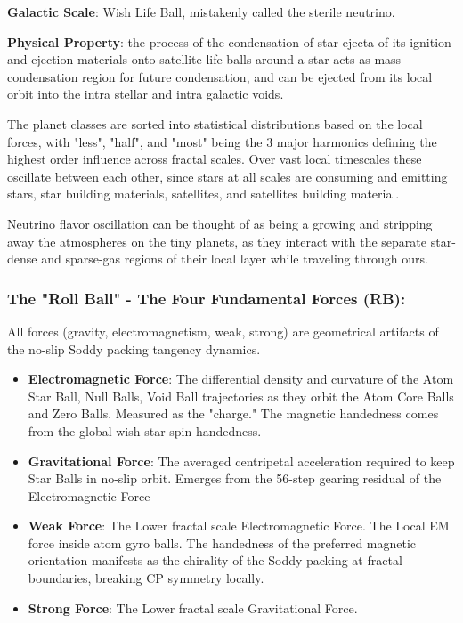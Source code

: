\documentclass[11pt,a4paper]{article}
\begin{document}
    \noindent\textbf{Galactic Scale}: Wish Life Ball, mistakenly called the sterile neutrino.

    \noindent\textbf{Physical Property}: the process of the condensation of star ejecta of its ignition and ejection materials onto satellite life balls around a star acts as mass condensation region for future condensation, and can be ejected from its local orbit into the intra stellar and intra galactic voids.

    The planet classes are sorted into statistical distributions based on the local forces, with "less", "half", and "most" being the 3 major harmonics defining the highest order influence across fractal scales. Over vast local timescales these oscillate between each other, since stars at all scales are consuming and emitting stars, star building materials, satellites, and satellites building material.

    Neutrino flavor oscillation can be thought of as being a growing and stripping away the atmospheres on the tiny planets, as they interact with the separate star-dense and sparse-gas regions of their local layer while traveling through ours.


    \subsubsection{The "Roll Ball" - The Four Fundamental Forces (RB):}

    All forces (gravity, electromagnetism, weak, strong) are geometrical artifacts of the no-slip Soddy packing tangency dynamics.

    \begin{itemize}
    \item \textbf{Electromagnetic Force}: The differential density and curvature of the Atom Star Ball, Null Balls, Void Ball trajectories as they orbit the Atom Core Balls and Zero Balls. Measured as the "charge." The magnetic handedness comes from the global wish star spin handedness.

    \item \textbf{Gravitational Force}: The averaged centripetal acceleration required to keep Star Balls in no-slip orbit. Emerges from the 56-step gearing residual of the Electromagnetic Force

    \item \textbf{Weak Force}: The Lower fractal scale Electromagnetic Force. The Local EM force inside atom gyro balls. The handedness of the preferred magnetic orientation manifests as the chirality of the Soddy packing at fractal boundaries, breaking CP symmetry locally.

    \item \textbf{Strong Force}: The Lower fractal scale Gravitational Force.

    \end{itemize}
\end{document}
